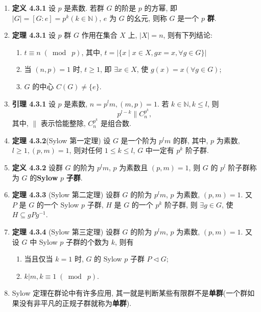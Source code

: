 \documentclass{ctexart}
\begin{document}
\begin{enumerate}
\item \textbf{定义 4.3.1} 设 $p$ 是素数. 若群 $G$ 的阶是 $p$ 的方幂, 即 $\left\lvert G\right\lvert = [G : e] = p^k(k \in \mathbb{N})$, $e$ 为 $G$ 的幺元, 则称 $G$ 是一个 $p$ \textbf{群}.
\item \textbf{定理 4.3.1} 设 $p$ 群 $G$ 作用在集合 $X$ 上, $\left\lvert X\right\rvert = n$, 则有下列结论:
\begin{enumerate}
  \item $t \equiv n\;(\bmod\;p)$, 其中, $t = \left\lvert\{x \mid x\in X, gx=x,\forall g\in G\}\right\rvert$
  \item 当 $(n,p) = 1$ 时, $t\geqslant1$, 即 $\exists x\in X$, 使 $g(x) = x(\forall g\in G)$;
  \item $G$ 的中心 $C(G)\neq\{e\}$.
\end{enumerate}

\item \textbf{引理 4.3.1} 设 $p$ 是素数, $n = p^lm, (m,p) = 1$. 若 $k\in\mathbb{N},k\leqslant l$, 则
\[
p^{l-k}\|C_n^{p^k},
\]
其中, $\|$ 表示恰能整除, $C_n^{p^k}$ 是组合数.

\item \textbf{定理 4.3.2}(Sylow 第一定理) 设 $G$ 是一个阶为 $p^lm$ 的群, 其中, $p$ 为素数, $l \geqslant 1, (p,m) = 1$, 则对任何 $1 \leqslant k \leqslant l$, $G$ 中一定有 $p^k$ 阶子群.

\item \textbf{定义 4.3.2} 设群 $G$ 的阶为 $p^lm$, $p$ 为素数且 $(p,m) = 1$, 则 $G$ 的 $p^l$ 阶子群称为 $G$ 的\textbf{Sylow} $p$ \textbf{子群}.

\item \textbf{定理 4.3.3} (Sylow 第二定理) 设群 $G$ 的阶为 $p^lm$, $p$ 为素数, $(p,m) = 1$. 又 $P$ 是 $G$ 的一个 Sylow $p$ 子群, $H$ 是 $G$ 的一个 $p^k$ 阶子群, 则 $\exists g\in G$, 使 $H\subseteq gPg^{-1}$.

\item \textbf{定理 4.3.4} (Sylow 第三定理) 设群 $G$ 的阶为 $p^lm$, $p$ 为素数, $(p,m) = 1$. 又设 $G$ 中 Sylow $p$ 子群的个数为 $k$, 则有
    \begin{enumerate}
      \item 当且仅当 $k = 1$ 时, $G$ 的 Sylow $p$ 子群 $P\vartriangleleft G$;
      \item $k|m, k \equiv 1\;(\bmod\;p)$.
    \end{enumerate}

\item Sylow 定理在群论中有许多应用, 其一就是判断某些有限群不是\textbf{单群}(一个群如果没有非平凡的正规子群就称为\textbf{单群}).


\end{enumerate}
\end{document}
